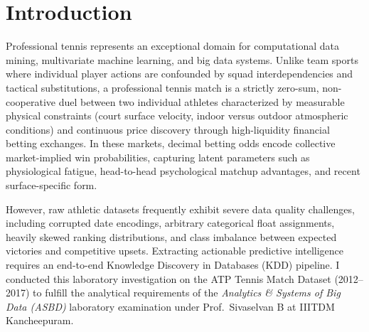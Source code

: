 \documentclass[10pt,journal]{IEEEtran}
\begin{document}
\section{Introduction}
Professional tennis represents an exceptional domain for computational data mining, multivariate machine learning, and big data systems. Unlike team sports where individual player actions are confounded by squad interdependencies and tactical substitutions, a professional tennis match is a strictly zero-sum, non-cooperative duel between two individual athletes characterized by measurable physical constraints (court surface velocity, indoor versus outdoor atmospheric conditions) and continuous price discovery through high-liquidity financial betting exchanges. In these markets, decimal betting odds encode collective market-implied win probabilities, capturing latent parameters such as physiological fatigue, head-to-head psychological matchup advantages, and recent surface-specific form.

However, raw athletic datasets frequently exhibit severe data quality challenges, including corrupted date encodings, arbitrary categorical float assignments, heavily skewed ranking distributions, and class imbalance between expected victories and competitive upsets. Extracting actionable predictive intelligence requires an end-to-end Knowledge Discovery in Databases (KDD) pipeline. I conducted this laboratory investigation on the ATP Tennis Match Dataset (2012--2017) to fulfill the analytical requirements of the \textit{Analytics \& Systems of Big Data (ASBD)} laboratory examination under Prof.\ Sivaselvan B at IIITDM Kancheepuram.
\end{document}
